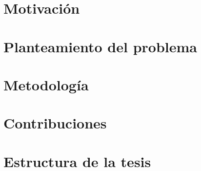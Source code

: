 \section{Motivación}
\blindtext

\section{Planteamiento del problema}
\blindtext

\section{Metodología} 
\blindtext


\section{Contribuciones} %
\blindtext


\section{Estructura de la tesis} %
\blindtext

